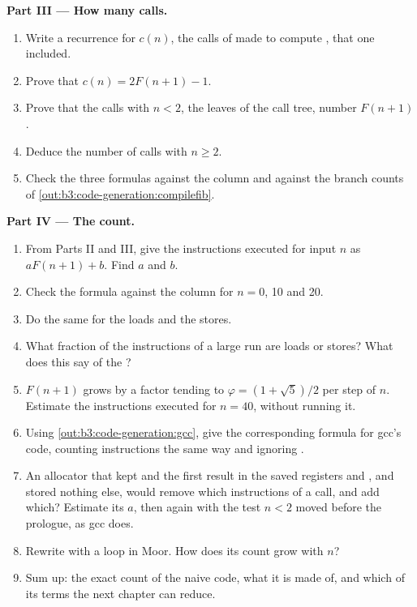 \begin{problem}
\medskip\noindent\textbf{Part III --- How many calls.}
\begin{enumerate}[resume]
\item Write a recurrence for $c(n)$, the calls of  made to compute , that one included.
\item Prove that $c(n) = 2F(n+1) - 1$.
\item Prove that the calls with $n < 2$, the leaves of the call tree, number $F(n+1)$.
\item Deduce the number of calls with $n \ge 2$.
\item Check the three formulas against the  column and against the branch counts of \cref{out:b3:code-generation:compilefib}.
\end{enumerate}

\medskip\noindent\textbf{Part IV --- The count.}
\begin{enumerate}[resume]
\item From Parts II and III, give the instructions executed for input $n$ as $a F(n+1) + b$. Find $a$ and $b$.
\item Check the formula against the  column for $n = 0$, 10 and 20.
\item Do the same for the loads and the stores.
\item What fraction of the instructions of a large run are loads or stores? What does this say of the ?
\item $F(n+1)$ grows by a factor tending to $\varphi = (1 + \sqrt 5)/2$ per step of $n$. Estimate the instructions executed for $n = 40$, without running it.
\item Using \cref{out:b3:code-generation:gcc}, give the corresponding formula for gcc's code, counting instructions the same way and ignoring .
\item An allocator that kept  and the first result in the saved registers  and , and stored nothing else, would remove which instructions of a call, and add which? Estimate its $a$, then again with the test $n < 2$ moved before the prologue, as gcc does.
\item Rewrite  with a loop in Moor. How does its count grow with $n$?
\item Sum up: the exact count of the naive code, what it is made of, and which of its terms the next chapter can reduce.
\end{enumerate}
\end{problem}
